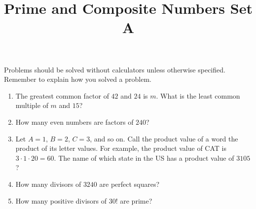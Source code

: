 \documentclass[twocolumn]{article}
\title{Prime and Composite Numbers Set A}
\date{}
\author{}
\begin{document}
\maketitle
\noindent Problems should be solved without calculators unless otherwise specified.
Remember to explain how you solved a problem.
\begin{enumerate}
    \item The greatest common factor of $42$ and $24$ is $m$.
        What is the least common multiple of $m$ and $15$?
        \vspace{3cm}
    \item How many even numbers are factors of $240$?
        \vspace{3cm}
    \item Let $A = 1$, $B = 2$, $C = 3$, and so on.
        Call the product value of a word the product of its letter values.
        For example, the product value of CAT is $3 \cdot 1 \cdot 20 = 60$.
        The name of which state in the US has a product value of $3105$?
        \vspace{3cm}
    \item How many divisors of $3240$ are perfect squares?
        \vspace{3cm}
    \item How many positive divisors of $30!$ are prime?
        \vspace{3cm}
\end{enumerate}
\end{document}
